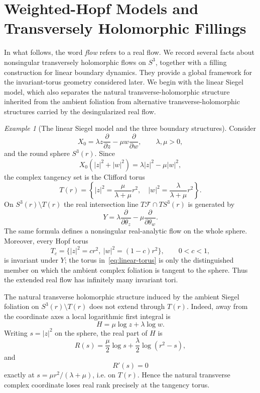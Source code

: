\documentclass[11pt,reqno]{article}
\theoremstyle{remark}
\newtheorem{exe}[theorem]{Example}
\newcommand{\F}{\mathcal F}
\newcommand{\pd}{\partial}
\begin{document}
\section{Weighted-Hopf Models and Transversely Holomorphic Fillings}
In what follows, the word {\em flow} refers to a real flow. We record several facts about nonsingular transversely holomorphic flows on $S^3$, together with a filling construction for linear boundary dynamics. They provide a global framework for the invariant-torus geometry considered later. We begin with the linear Siegel model, which also separates the natural transverse-holomorphic structure inherited from the ambient foliation from alternative transverse-holomorphic structures carried by the desingularized real flow.




\begin{exe}[The linear Siegel model and the three boundary structures]
\label{section:siegellinear}
Consider
\[
 X_0=\lambda z\frac{\pd}{\pd z}-\mu w\frac{\pd}{\pd w},
 \qquad \lambda,\mu>0,
\]
and the round sphere $S^3(r)$. Since
\[
 X_0(|z|^2+|w|^2)=\lambda|z|^2-\mu|w|^2,
\]
the complex tangency set is the Clifford torus
\begin{equation}\label{eq:linear-torus}
 T(r)=\left\{|z|^2=\frac{\mu}{\lambda+\mu}r^2,\quad
 |w|^2=\frac{\lambda}{\lambda+\mu}r^2\right\}.
\end{equation}
On $S^3(r)\setminus T(r)$ the real intersection line $T\F\cap TS^3(r)$ is generated by
\[
 Y=\lambda\frac{\pd}{\pd\theta_z}-\mu\frac{\pd}{\pd\theta_w}.
\]
The same formula defines a nonsingular real-analytic flow on the whole sphere. Moreover, every Hopf torus
\[
 T_c=\{|z|^2=cr^2,\ |w|^2=(1-c)r^2\},\qquad 0<c<1,
\]
is invariant under $Y$; the torus in~\eqref{eq:linear-torus} is only the distinguished member on which the ambient complex foliation is tangent to the sphere. Thus the extended real flow has infinitely many invariant tori.

The natural transverse holomorphic structure induced by the ambient Siegel foliation on $S^3(r)\setminus T(r)$ does not extend through $T(r)$. Indeed, away from the coordinate axes a local logarithmic first integral is
\[
 H=\mu\log z+\lambda\log w.
\]
Writing $s=|z|^2$ on the sphere, the real part of $H$ is
\[
 R(s)=\frac{\mu}{2}\log s+\frac{\lambda}{2}\log(r^2-s),
\]
and
\[
 R'(s)=0
\]
exactly at $s=\mu r^2/(\lambda+\mu)$, i.e. on $T(r)$. Hence the natural transverse complex coordinate loses real rank precisely at the tangency torus.


\end{exe}
\end{document}
